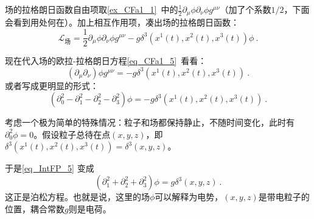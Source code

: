 场的拉格朗日函数自由项取\autoref{ex_CFa1_1}~中的$\frac{1}{2}\partial_\mu\phi\partial_\nu\phi g^{\mu\nu}$（加了个系数$1/2$，下面会看到用处何在）。加上相互作用项，凑出场的拉格朗日函数：
\begin{equation}
\mathcal{L}_{\text{场}} = \frac{1}{2}\partial_\mu\phi\partial_\nu\phi g^{\mu\nu} - g\delta^3(x^1(t), x^2(t), x^3(t))\phi~.
\end{equation}

现在代入场的欧拉-拉格朗日方程\autoref{eq_CFa1_5}~看看：
\begin{equation}
(\partial_\mu\partial_\nu)\phi g^{\mu\nu} = -g\delta^3(x^1(t), x^2(t), x^3(t))~.
\end{equation}
或者写成更明显的形式：
\begin{equation}\label{eq_IntFP_5}
(\partial_0^2-\partial_1^2-\partial_2^2-\partial_3^2)\phi = -g\delta^3(x^1(t), x^2(t), x^3(t))~.
\end{equation}

考虑一个极为简单的特殊情况：粒子和场都保持静止，不随时间变化，此时有$\partial_0^2\phi = 0$。假设粒子总待在点$(x, y, z)$，即$\delta^3(x^1(t), x^2(t), x^3(t))=\delta^3(x, y, z)$。

于是\autoref{eq_IntFP_5} 变成
\begin{equation}
(\partial_1^2+\partial_2^2+\partial_3^2)\phi = g\delta^3(x, y, z)~.
\end{equation}
这正是泊松方程。也就是说，这里的场$\phi$可以解释为电势，$(x, y, z)$是带电粒子的位置，耦合常数$g$则是电荷。















